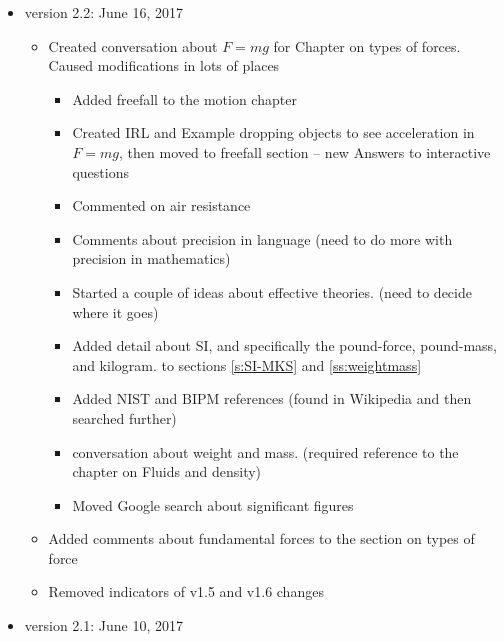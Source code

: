 \documentclass[11pt,letter,openany,makeidx]{book}
\newcounter{IRL}
\begin{document}
\begin{titlepage}
\begin{ForReviewer}
{\begin{itemize}
\begin{itemize}
        \item Developed the weight and mass discussion and examples
        \item Ladder leaning example in torque, plus some homework problems
        \item Added some Conceptual Homework to weight/mass
        \item Added placeholders to the Gravity chapter
        \item Removed indicators of v1.7 changes
        \end{itemize}
    \item version 2.2: June 16, 2017
        \begin{itemize}
        \item Created conversation about $F=mg$ for Chapter on types of forces.  Caused modifications in lots of places
            \begin{itemize}
            \item Added freefall to the motion chapter
            \item Created IRL and Example dropping objects to see acceleration in $F=mg$, then moved to freefall section -- new Answers to interactive questions
            \item Commented on air resistance
            \item Comments about precision in language (need to do more with precision in mathematics)
            \item Started a couple of ideas about effective theories.  (need to decide where it goes)
            \item Added detail about SI, and specifically the pound-force, pound-mass, and kilogram. to sections \ref{s:SI-MKS} and \ref{ss:weightmass}
            \item Added NIST and BIPM references (found in Wikipedia and then searched further)
            \item conversation about weight and mass.  (required reference to the chapter on Fluids and density)
            \item Moved Google search about significant figures
            \end{itemize}
        \item Added comments about fundamental forces to the section on types of force
        \item Removed indicators of v1.5 and v1.6 changes
        \end{itemize}
    \item version 2.1: June 10, 2017

\end{itemize}}
\end{ForReviewer}
\end{titlepage}
\end{document}
